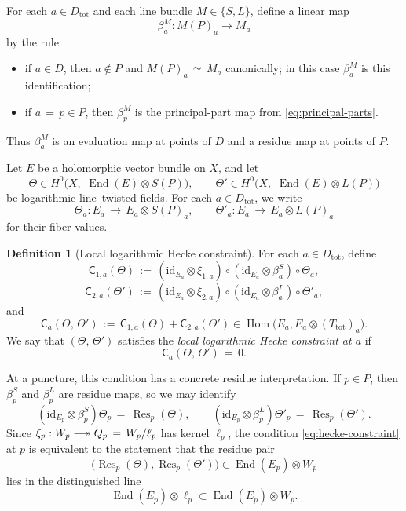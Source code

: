\documentclass[a4paper,12pt]{amsart}
\numberwithin{equation}{section}
\theoremstyle{definition}
\newtheorem{definition}[theorem]{Definition}
\newcommand{\End}{\operatorname{End}}
\newcommand{\Hom}{\operatorname{Hom}}
\newcommand{\Res}{\operatorname{Res}}
\newcommand{\id}{\mathrm{id}}
\newcommand{\longtwoheadrightarrow}{\mathrel{\relbar\joinrel\twoheadrightarrow}}
\begin{document}
For each \(a\in D_{\mathrm{tot}}\) and each line bundle \(M\in\{S,L\}\), define a linear map
\[
\beta_a^M:M(P)_a\longrightarrow M_a
\]
by the rule
\begin{itemize}
\item if \(a\in D\), then \(a\notin P\) and \(M(P)_a\,\simeq\, M_a\) canonically; in this case \(\beta_a^M\) is this identification;
\item if \(a\,=\,p\in P\), then \(\beta_p^M\) is the principal-part map from \eqref{eq:principal-parts}.
\end{itemize}
Thus \(\beta_a^M\) is an evaluation map at points of \(D\) and a residue map at points of \(P\).

Let \(E\) be a holomorphic vector bundle on \(X\), and let
\[
\Theta\in H^0\bigl(X,\,\, \End(E)\otimes S(P)\bigr),\qquad
\Theta'\in H^0\bigl(X,\,\, \End(E)\otimes L(P)\bigr)
\]
be logarithmic line--twisted fields.  For each \(a\in D_{\mathrm{tot}}\), we write
\[
\Theta_a:E_a\,\longrightarrow\, E_a\otimes S(P)_a,\qquad
\Theta'_a:E_a\,\longrightarrow\, E_a\otimes L(P)_a
\]
for their fiber values.

\begin{definition}[Local logarithmic Hecke constraint]\label{def:hecke-constraint}
For each \(a\in D_{\mathrm{tot}}\), define
\[
\mathsf{C}_{1,a}(\Theta)\,:=\,
(\id_{E_a}\otimes \xi_{1,a})\circ (\id_{E_a}\otimes \beta_a^S)\circ \Theta_a,
\]
\[
\mathsf{C}_{2,a}(\Theta')\,:=\,
(\id_{E_a}\otimes \xi_{2,a})\circ (\id_{E_a}\otimes \beta_a^L)\circ \Theta'_a,
\]
and
\[
\mathsf{C}_a(\Theta,\,\Theta')\,:=\,\mathsf{C}_{1,a}(\Theta)+\mathsf{C}_{2,a}(\Theta')
\in
\Hom\bigl(E_a,E_a\otimes (T_{\mathrm{tot}})_a\bigr).
\]
We say that \((\Theta,\,\Theta')\) satisfies the \emph{local logarithmic Hecke constraint at \(a\)} if
\begin{equation}\label{eq:hecke-constraint}
\mathsf{C}_a(\Theta,\,\Theta')\,=\,0.
\end{equation}
\end{definition}

At a puncture, this condition has a concrete residue interpretation.  If \(p\in P\), then \(\beta_p^S\) and \(\beta_p^L\) are residue maps, so we may identify
\[
(\id_{E_p}\otimes \beta_p^S)\Theta_p\,=\,\Res_p(\Theta),\qquad
(\id_{E_p}\otimes \beta_p^L)\Theta'_p\,=\,\Res_p(\Theta').
\]
Since \(\xi_p:W_p\longtwoheadrightarrow Q_p\,=\,W_p/\ell_p\) has kernel \(\ell_p\), the condition \eqref{eq:hecke-constraint} at \(p\) is equivalent to the statement that the residue pair
\[
\bigl(\Res_p(\Theta),\Res_p(\Theta')\bigr)\in \End(E_p)\otimes W_p
\]
lies in the distinguished line
\[
\End(E_p)\otimes \ell_p\subset \End(E_p)\otimes W_p.
\]
\end{document}
